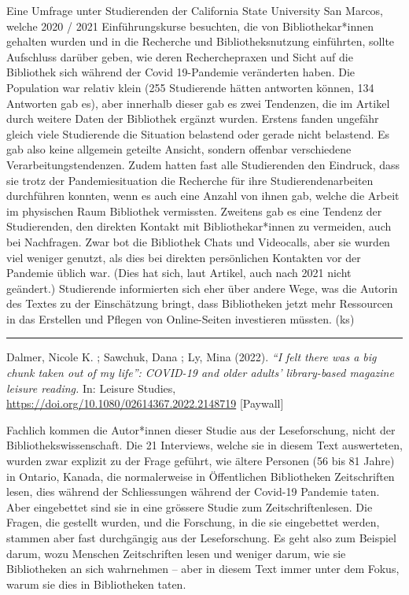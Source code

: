 \documentclass[a4paper,
fontsize=11pt,
oneside,
numbers=noperiodatend,
parskip=half-,
bibliography=totoc,
final
]{scrartcl}
\begin{document}
Eine Umfrage unter Studierenden der California State University San
Marcos, welche 2020 / 2021 Einführungskurse besuchten, die von
Bibliothekar*innen gehalten wurden und in die Recherche und
Bibliotheksnutzung einführten, sollte Aufschluss darüber geben, wie
deren Recherchepraxen und Sicht auf die Bibliothek sich während der
Covid 19-Pandemie veränderten haben. Die Population war relativ klein
(255 Studierende hätten antworten können, 134 Antworten gab es), aber
innerhalb dieser gab es zwei Tendenzen, die im Artikel durch weitere
Daten der Bibliothek ergänzt wurden. Erstens fanden ungefähr gleich
viele Studierende die Situation belastend oder gerade nicht belastend.
Es gab also keine allgemein geteilte Ansicht, sondern offenbar
verschiedene Verarbeitungstendenzen. Zudem hatten fast alle Studierenden
den Eindruck, dass sie trotz der Pandemiesituation die Recherche für
ihre Studierendenarbeiten durchführen konnten, wenn es auch eine Anzahl
von ihnen gab, welche die Arbeit im physischen Raum Bibliothek
vermissten. Zweitens gab es eine Tendenz der Studierenden, den direkten
Kontakt mit Bibliothekar*innen zu vermeiden, auch bei Nachfragen. Zwar
bot die Bibliothek Chats und Videocalls, aber sie wurden viel weniger
genutzt, als dies bei direkten persönlichen Kontakten vor der Pandemie
üblich war. (Dies hat sich, laut Artikel, auch nach 2021 nicht
geändert.) Studierende informierten sich eher über andere Wege, was die
Autorin des Textes zu der Einschätzung bringt, dass Bibliotheken jetzt
mehr Ressourcen in das Erstellen und Pflegen von Online-Seiten
investieren müssten. (ks)

\begin{center}\rule{0.5\linewidth}{0.5pt}\end{center}

Dalmer, Nicole K. ; Sawchuk, Dana ; Ly, Mina (2022). \emph{\enquote{I
felt there was a big chunk taken out of my life}: COVID-19 and older
adults' library-based magazine leisure reading.} In: Leisure Studies,
\url{https://doi.org/10.1080/02614367.2022.2148719} {[}Paywall{]}

Fachlich kommen die Autor*innen dieser Studie aus der Leseforschung,
nicht der Bibliothekswissenschaft. Die 21 Interviews, welche sie in
diesem Text auswerteten, wurden zwar explizit zu der Frage geführt, wie
ältere Personen (56 bis 81 Jahre) in Ontario, Kanada, die normalerweise
in Öffentlichen Bibliotheken Zeitschriften lesen, dies während der
Schliessungen während der Covid-19 Pandemie taten. Aber eingebettet sind
sie in eine grössere Studie zum Zeitschriftenlesen. Die Fragen, die
gestellt wurden, und die Forschung, in die sie eingebettet werden,
stammen aber fast durchgängig aus der Leseforschung. Es geht also zum
Beispiel darum, wozu Menschen Zeitschriften lesen und weniger darum, wie
sie Bibliotheken an sich wahrnehmen -- aber in diesem Text immer unter
dem Fokus, warum sie dies in Bibliotheken taten.
\end{document}
